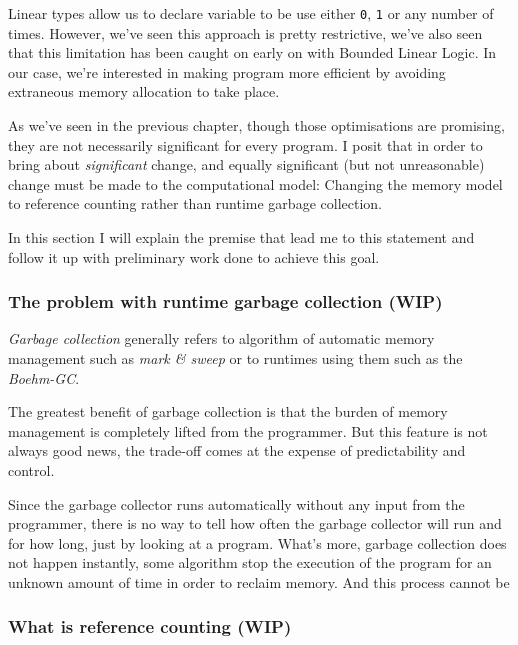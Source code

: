 \documentclass[
]{article}
\begin{document}
Linear types allow us to declare variable to be use either \texttt{0},
\texttt{1} or any number of times. However, we've seen this approach is
pretty restrictive, we've also seen that this limitation has been caught
on early on with Bounded Linear Logic. In our case, we're interested in
making program more efficient by avoiding extraneous memory allocation
to take place.

As we've seen in the previous chapter, though those optimisations are
promising, they are not necessarily significant for every program. I
posit that in order to bring about \emph{significant} change, and
equally significant (but not unreasonable) change must be made to the
computational model: Changing the memory model to reference counting
rather than runtime garbage collection.

In this section I will explain the premise that lead me to this
statement and follow it up with preliminary work done to achieve this
goal.

\hypertarget{the-problem-with-runtime-garbage-collection-wip}{%
\subsubsection{The problem with runtime garbage collection
(WIP)}\label{the-problem-with-runtime-garbage-collection-wip}}

\emph{Garbage collection} generally refers to algorithm of automatic
memory management such as \emph{mark \& sweep} or to runtimes using them
such as the \emph{Boehm-GC}.

The greatest benefit of garbage collection is that the burden of memory
management is completely lifted from the programmer. But this feature is
not always good news, the trade-off comes at the expense of
predictability and control.

Since the garbage collector runs automatically without any input from
the programmer, there is no way to tell how often the garbage collector
will run and for how long, just by looking at a program. What's more,
garbage collection does not happen instantly, some algorithm stop the
execution of the program for an unknown amount of time in order to
reclaim memory. And this process cannot be

\hypertarget{what-is-reference-counting-wip}{%
\subsubsection{What is reference counting
(WIP)}\label{what-is-reference-counting-wip}}
\end{document}
